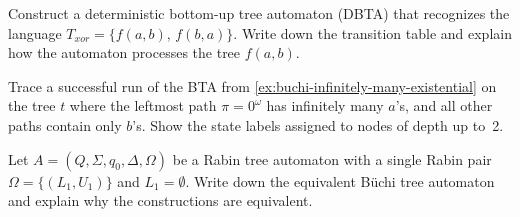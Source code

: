 \begin{chapex}
Construct a deterministic bottom-up tree automaton (DBTA) that recognizes the language $T_{xor} = \{ f(a,b), \, f(b,a) \}$.  Write down the transition table and explain how the automaton processes the tree $f(a,b)$.
\end{chapex}

\begin{chapex}
Trace a successful run of the BTA from \cref{ex:buchi-infinitely-many-existential} on the tree $t$ where the leftmost path $\pi = 0^\omega$ has infinitely many $a$'s, and all other paths contain only $b$'s.  Show the state labels assigned to nodes of depth up to~2.
\end{chapex}

\begin{chapex}
Let $A = (Q, \Sigma, q_0, \Delta, \Omega)$ be a Rabin tree automaton with a single Rabin pair $\Omega = \{ (L_1, U_1) \}$ and $L_1 = \emptyset$.  Write down the equivalent B\"uchi tree automaton and explain why the constructions are equivalent.
\end{chapex}
